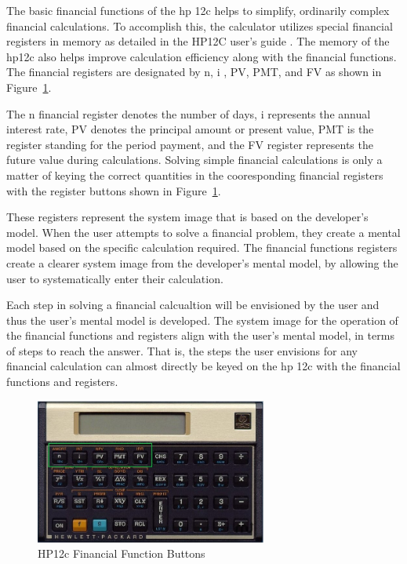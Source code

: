 \documentclass{article}
\begin{document}
The basic financial functions of the hp 12c helps to simplify, ordinarily complex financial calculations. To accomplish this, the calculator utilizes special financial registers in memory as detailed in the HP12C user's guide \cite{hp12c}. The memory of the hp12c also helps improve calculation efficiency along with the financial functions. The financial registers are designated by n, i , PV, PMT, and FV as shown in Figure~\ref{financial-buttons}.

The n financial register denotes the number of days, i represents the annual interest rate, PV denotes the principal amount or present value, PMT is the register standing for the period payment, and the FV register represents the future value during calculations. Solving simple financial calculations is only a matter of keying the correct quantities in the cooresponding financial registers with the register buttons shown in Figure~\ref{financial-buttons}.

These registers represent the system image that is based on the developer's model. When the user attempts to solve a financial problem, they create a mental model based on the specific calculation required. The financial functions registers create a clearer system image from the developer's mental model, by allowing the user to systematically enter their calculation. 

Each step in solving a financial calcualtion will be envisioned by the user and thus the user's mental model is developed. The system image for the operation of the financial functions and registers align with the user's mental model, in terms of steps to reach the answer. That is, the steps the user envisions for any financial calculation can almost directly be keyed on the hp 12c with the financial functions and registers.

\begin{figure}
\centering
\includegraphics[width=3in]{Figure_1.jpg}
\caption{HP12c Financial Function Buttons}
\label{financial-buttons}
\end{figure}
\end{document}
